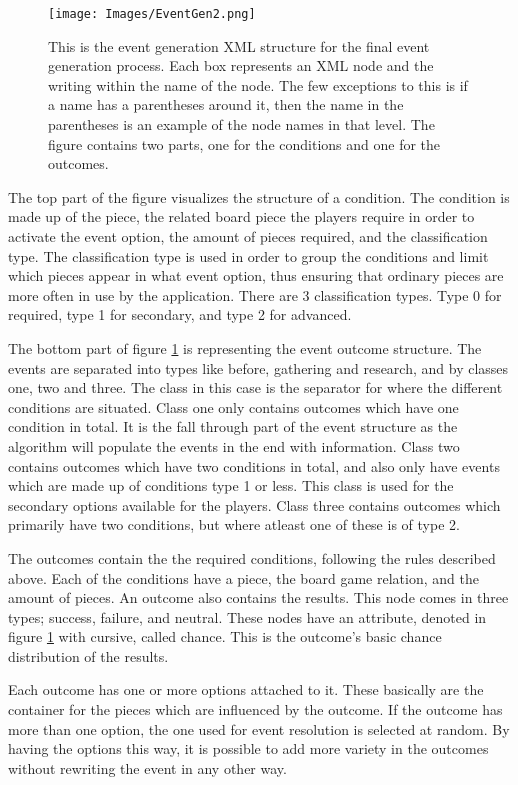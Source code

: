 \begin{figure}[!ht]
    \centering
    \texttt{[image: Images/EventGen2.png]}
    \caption{This is the event generation XML structure for the final event generation process. Each box represents an XML node and the writing within the name of the node. The few exceptions to this is if a name has a parentheses around it, then the name in the parentheses is an example of the node names in that level. The figure contains two parts, one for the conditions and one for the outcomes.}
    \label{fig:eGen2}
\end{figure}

The top part of the figure visualizes the structure of a condition. The condition is made up of the piece, the related board piece the players require in order to activate the event option, the amount of pieces required, and the classification type.
The classification type is used in order to group the conditions and limit which pieces appear in what event option, thus ensuring that ordinary pieces are more often in use by the application. There are 3 classification types. Type 0 for required, type 1 for secondary, and type 2 for advanced.

The bottom part of figure \ref{fig:eGen2} is representing the event outcome structure. The events are separated into types like before, gathering and research, and by classes one, two and three. 
The class in this case is the separator for where the different conditions are situated. Class one only contains outcomes which have one condition in total. It is the fall through part of the event structure as the algorithm will populate the events in the end with information.
Class two contains outcomes which have two conditions in total, and also only have events which are made up of conditions type 1 or less. 
This class is used for the secondary options available for the players.
Class three contains outcomes which primarily have two conditions, but where atleast one of these is of type 2.

The outcomes contain the the required conditions, following the rules described above. Each of the conditions have a piece, the board game relation, and the amount of pieces. 
An outcome also contains the results. This node comes in three types; success, failure, and neutral. These nodes have an attribute, denoted in figure \ref{fig:eGen2} with cursive, called chance. This is the outcome's basic chance distribution of the results. 

Each outcome has one or more options attached to it. These basically are the container for the pieces which are influenced by the outcome. If the outcome has more than one option, the one used for event resolution is selected at random. 
By having the options this way, it is possible to add more variety in the outcomes without rewriting the event in any other way.

